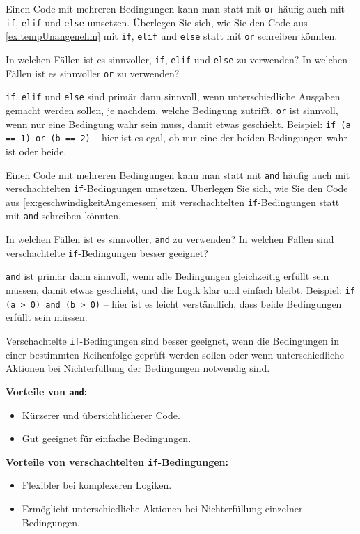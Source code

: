 \begin{mychallenge}
	Einen Code mit mehreren Bedingungen kann man statt mit \lstinline|or| häufig auch mit \lstinline|if|, \lstinline|elif| und \lstinline|else| umsetzen. Überlegen Sie sich, wie Sie den Code aus \cref{ex:tempUnangenehm} mit \lstinline|if|, \lstinline|elif| und \lstinline|else| statt mit \lstinline|or| schreiben könnten.

	In welchen Fällen ist es sinnvoller, \lstinline|if|, \lstinline|elif| und \lstinline|else| zu verwenden? In welchen Fällen ist es sinnvoller \lstinline|or| zu verwenden?
	\begin{myanswer}
		\lstinline|if|, \lstinline|elif| und \lstinline|else| sind primär dann sinnvoll, wenn unterschiedliche Ausgaben gemacht werden sollen, je nachdem, welche Bedingung zutrifft. \lstinline|or| ist sinnvoll, wenn nur eine Bedingung wahr sein muss, damit etwas geschieht. Beispiel: \lstinline|if (a == 1) or (b == 2)| -- hier ist es egal, ob nur eine der beiden Bedingungen wahr ist oder beide.
	\end{myanswer}
\end{mychallenge}

\begin{mychallenge}
	Einen Code mit mehreren Bedingungen kann man statt mit \lstinline|and| häufig auch mit verschachtelten \lstinline|if|-Bedingungen umsetzen. Überlegen Sie sich, wie Sie den Code aus \cref{ex:geschwindigkeitAngemessen} mit verschachtelten \lstinline|if|-Bedingungen statt mit \lstinline|and| schreiben könnten.

	In welchen Fällen ist es sinnvoller, \lstinline|and| zu verwenden? In welchen Fällen sind verschachtelte \lstinline|if|-Bedingungen besser geeignet?
	\begin{myanswer}
		\lstinline|and| ist primär dann sinnvoll, wenn alle Bedingungen gleichzeitig erfüllt sein müssen, damit etwas geschieht, und die Logik klar und einfach bleibt. Beispiel: \lstinline|if (a > 0) and (b > 0)| -- hier ist es leicht verständlich, dass beide Bedingungen erfüllt sein müssen.

		Verschachtelte \lstinline|if|-Bedingungen sind besser geeignet, wenn die Bedingungen in einer bestimmten Reihenfolge geprüft werden sollen oder wenn unterschiedliche Aktionen bei Nichterfüllung der Bedingungen notwendig sind.

		\textbf{Vorteile von \lstinline|and|:}
		\begin{itemize}
			\item Kürzerer und übersichtlicherer Code.
			\item Gut geeignet für einfache Bedingungen.
		\end{itemize}

		\textbf{Vorteile von verschachtelten \lstinline|if|-Bedingungen:}
		\begin{itemize}
			\item Flexibler bei komplexeren Logiken.
			\item Ermöglicht unterschiedliche Aktionen bei Nichterfüllung einzelner Bedingungen.
		\end{itemize}
	\end{myanswer}
\end{mychallenge}


